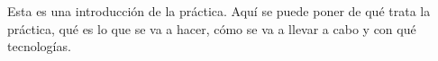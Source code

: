 \documentclass[../../main.tex]{subfile}
\begin{document}
  Esta es una introducción de la práctica. Aquí se puede poner de qué trata la práctica, qué es lo que se va a hacer, cómo se va a llevar a cabo y con qué tecnologías.
\end{document}

